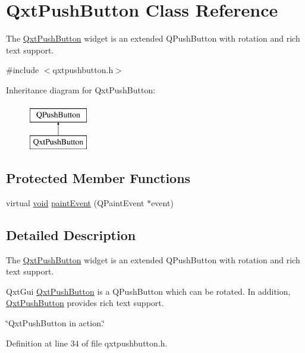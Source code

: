 \hypertarget{class_qxt_push_button}{\section{Qxt\-Push\-Button Class Reference}
\label{class_qxt_push_button}
}


The \hyperlink{class_qxt_push_button}{Qxt\-Push\-Button} widget is an extended Q\-Push\-Button with rotation and rich text support.  




{\ttfamily \#include $<$qxtpushbutton.\-h$>$}

Inheritance diagram for Qxt\-Push\-Button\-:\begin{figure}[H]
\begin{center}
\leavevmode
\includegraphics[height=2.000000cm]{class_qxt_push_button}
\end{center}
\end{figure}
\subsection*{Protected Member Functions}
\begin{DoxyCompactItemize}
\item 
virtual \hyperlink{group___u_a_v_objects_plugin_ga444cf2ff3f0ecbe028adce838d373f5c}{void} \hyperlink{class_qxt_push_button_a95719d791141d825fd8768ada15a5580}{paint\-Event} (Q\-Paint\-Event $\ast$event)
\end{DoxyCompactItemize}


\subsection{Detailed Description}
The \hyperlink{class_qxt_push_button}{Qxt\-Push\-Button} widget is an extended Q\-Push\-Button with rotation and rich text support. 

Qxt\-Gui \hyperlink{class_qxt_push_button}{Qxt\-Push\-Button} is a Q\-Push\-Button which can be rotated. In addition, \hyperlink{class_qxt_push_button}{Qxt\-Push\-Button} provides rich text support.

\char`\"{}\-Qxt\-Push\-Button in action.\char`\"{} 

Definition at line 34 of file qxtpushbutton.\-h.



